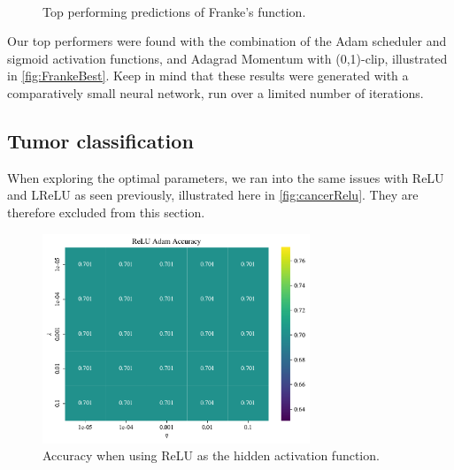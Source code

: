 \documentclass{article}
\theoremstyle{definition}
\begin{document}
\begin{figure}[H]%
    \centering
    \\
    \caption{Top performing predictions of Franke's function.}%
    \label{fig:FrankeBest}%
\end{figure}

Our top performers were found with the combination of the Adam scheduler and sigmoid activation functions, and Adagrad Momentum with (0,1)-clip, illustrated in \autoref{fig:FrankeBest}. Keep in mind that these results were generated with a comparatively small neural network, run over a limited number of iterations.

\newpage
\subsection{Tumor classification}
When exploring the optimal parameters, we ran into the same issues with ReLU and LReLU as seen previously, illustrated here in \autoref{fig:cancerRelu}. They are therefore excluded from this section.
\begin{figure}[H]
    \centering
    \includegraphics[width=8cm]{Project2/figures/cancer_classification/ReLU_Adam_accuracy.pdf}
    \caption{Accuracy when using ReLU as the hidden activation function.}
    \label{fig:cancerRelu}
\end{figure}
\end{document}
